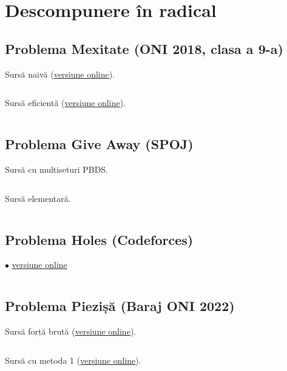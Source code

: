 \documentclass[../main.tex]{subfiles}
\begin{document}
\chapter{Descompunere în radical}

\section{Problema Mexitate (ONI 2018, clasa a 9-a)}
\label{code:mexitate}

Sursă naivă (\href{https://kilonova.ro/submissions/432885}{versiune online}).

\inputminted{cpp}{../src/sqrt-decomp/mexitate-1.cpp}

Sursă eficientă (\href{https://kilonova.ro/submissions/432892}{versiune online}).

\inputminted{cpp}{../src/sqrt-decomp/mexitate-2.cpp}

\section{Problema Give Away (SPOJ)}
\label{code:give-away}

Sursă cu multiseturi PBDS.

\inputminted{cpp}{../src/sqrt-decomp/give-away-1.cpp}

Sursă elementară.

\inputminted{cpp}{../src/sqrt-decomp/give-away-2.cpp}

\section{Problema Holes (Codeforces)}
\label{code:holes}
$\bullet$
\href{https://codeforces.com/contest/13/submission/346642193}{versiune online}

\inputminted{cpp}{../src/sqrt-decomp/holes.cpp}

\section{Problema Piezișă (Baraj ONI 2022)}
\label{code:piezișă}

Sursă forță brută (\href{https://infoarena.ro/job_detail/2932029?action=view-source}{versiune online}).

\inputminted{cpp}{../src/sqrt-decomp/piezișă-brute.cpp}

Sursă cu metoda 1 (\href{https://kilonova.ro/submissions/433317}{versiune online}).
\end{document}
